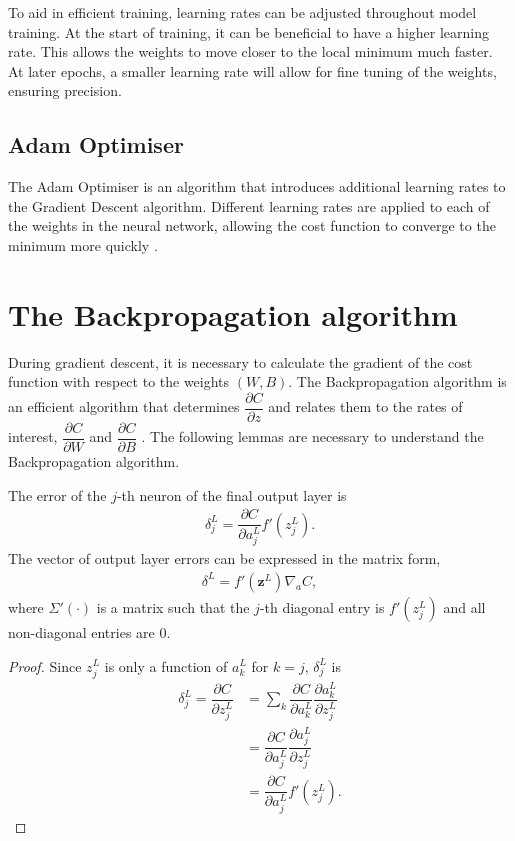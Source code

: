 To aid in efficient training, learning rates can be adjusted throughout model training. At the start of training, it can be beneficial to have a higher learning rate. This allows the weights to move closer to the local minimum much faster. At later epochs, a smaller learning rate will allow for fine tuning of the weights, ensuring precision.

\subsection*{Adam Optimiser}\label{nnets-adam}

The Adam Optimiser is an algorithm that introduces additional learning rates to the Gradient Descent algorithm. Different learning rates are applied to each of the weights in the neural network, allowing the cost function to converge to the minimum more quickly \citep{Kingma2014}.


\section{The Backpropagation algorithm}\label{nnets-backprop}

During gradient descent, it is necessary to calculate the gradient of the cost function with respect to the weights $(W,B)$. The Backpropagation algorithm is an efficient algorithm that determines $\dfrac{\partial C}{\partial z}$ and relates them to the rates of interest, $\dfrac{\partial C}{\partial W}$ and $\dfrac{\partial C}{\partial B}$ \citep{Nielson2015}. The following lemmas are necessary to understand the Backpropagation algorithm.


\begin{lemma}
	The error of the $j$-th neuron of the final output layer is
	\begin{align}
		\delta_j^L = \dfrac{\partial C}{\partial a_j^L}f'(z_j^L).
	\end{align}
	The vector of output layer errors can be expressed in the matrix form,
	\begin{align}\label{nnets-bprop-eq1}
		\delta^L = f'(\mathbf{z}^L)\nabla_aC,
	\end{align}
where $\Sigma'(\cdot)$ is a matrix such that the $j$-th diagonal entry is $f'(z_j^L)$ and all non-diagonal entries are 0.
\end{lemma}

\begin{proof}

Since $z_j^L$ is only a function of $a_k^L$ for $k = j$, $\delta_j^L$ is
	\begin{align}
		\delta_j^L = \dfrac{\partial C}{\partial z_j^L} & = \sum_k\dfrac{\partial C}{\partial a_k^L}\dfrac{\partial a_k^L}{\partial z_j^L} \\
		& = \dfrac{\partial C}{\partial a_j^L}\dfrac{\partial a_j^L}{\partial z_j^L}\\
		& = \dfrac{\partial C}{\partial a_j^L}f'(z_j^L).
	\end{align}
\end{proof}

